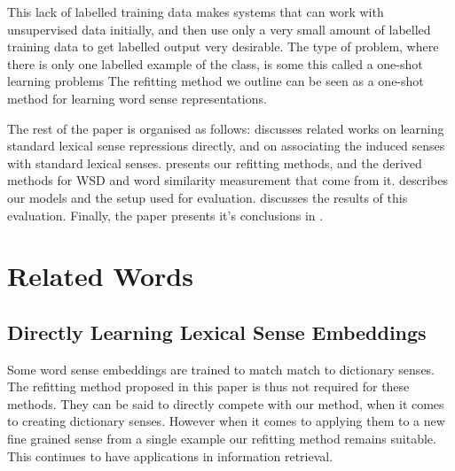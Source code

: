 \documentclass{sig-alternate}
\begin{document}
This lack of labelled training data makes systems that can work with unsupervised data initially, and then use only a very small amount of labelled training data to get labelled output very desirable.
The type of problem, where there is only one labelled example of the class, is some this called a one-shot learning problems
The refitting method we outline can be seen as a one-shot method for learning word sense representations.


The rest of the paper is organised as follows:  discusses related works on learning standard lexical sense repressions directly, and on associating the induced senses with standard lexical senses.  presents our refitting methods, and the derived methods for WSD and word similarity measurement that come from it.  describes our models and the setup used for evaluation.  discusses the results of this evaluation. Finally, the paper presents it's conclusions in .

\section{Related Words} \label{relatedwords}

\subsection{Directly Learning Lexical Sense Embeddings}
Some word sense embeddings are trained to match match to dictionary senses. The refitting method proposed in this paper is thus not required for these methods.
They can be said to directly compete with our method, when it comes to creating dictionary senses. However when it comes to applying them to a new fine grained sense from a single example our refitting method remains suitable. This continues to have applications in information retrieval.
\end{document}

